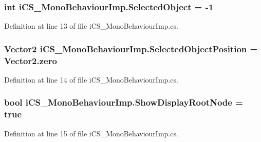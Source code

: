 \hypertarget{classi_c_s___mono_behaviour_imp_ad19610ebcf41db700efa9890eabe5476}{
\subsubsection[{Selected\+Object}]{\setlength{\rightskip}{0pt plus 5cm}int i\+C\+S\+\_\+\+Mono\+Behaviour\+Imp.\+Selected\+Object = -\/1}}\label{classi_c_s___mono_behaviour_imp_ad19610ebcf41db700efa9890eabe5476}


Definition at line 13 of file i\+C\+S\+\_\+\+Mono\+Behaviour\+Imp.\+cs.

\hypertarget{classi_c_s___mono_behaviour_imp_a2940746cae06b56cedd5e75873c5f6f5}{
\subsubsection[{Selected\+Object\+Position}]{\setlength{\rightskip}{0pt plus 5cm}Vector2 i\+C\+S\+\_\+\+Mono\+Behaviour\+Imp.\+Selected\+Object\+Position = Vector2.\+zero}}\label{classi_c_s___mono_behaviour_imp_a2940746cae06b56cedd5e75873c5f6f5}


Definition at line 14 of file i\+C\+S\+\_\+\+Mono\+Behaviour\+Imp.\+cs.

\hypertarget{classi_c_s___mono_behaviour_imp_abf3661d1041b4342561d1198fc360bf4}{
\subsubsection[{Show\+Display\+Root\+Node}]{\setlength{\rightskip}{0pt plus 5cm}bool i\+C\+S\+\_\+\+Mono\+Behaviour\+Imp.\+Show\+Display\+Root\+Node = true}}\label{classi_c_s___mono_behaviour_imp_abf3661d1041b4342561d1198fc360bf4}


Definition at line 15 of file i\+C\+S\+\_\+\+Mono\+Behaviour\+Imp.\+cs.

